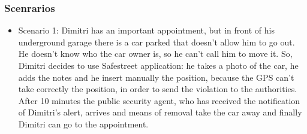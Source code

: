 \subsubsection{Scenrarios}
\begin{itemize}
\item Scenario 1:
\newline
Dimitri has an important appointment, but in front of his underground garage there is a car parked that doesn’t allow him to go out. He doesn’t know who the car owner is, so he can’t call him to move it. So, Dimitri decides to use Safestreet application: he takes a photo of the car, he adds the notes and he insert manually the position, because the GPS can’t take correctly the position, in order to send the violation to the authorities. After 10 minutes the public security agent, who has received the notification of Dimitri’s alert, arrives and means of removal take the car away and finally Dimitri can go to the appointment.



\end{itemize}
